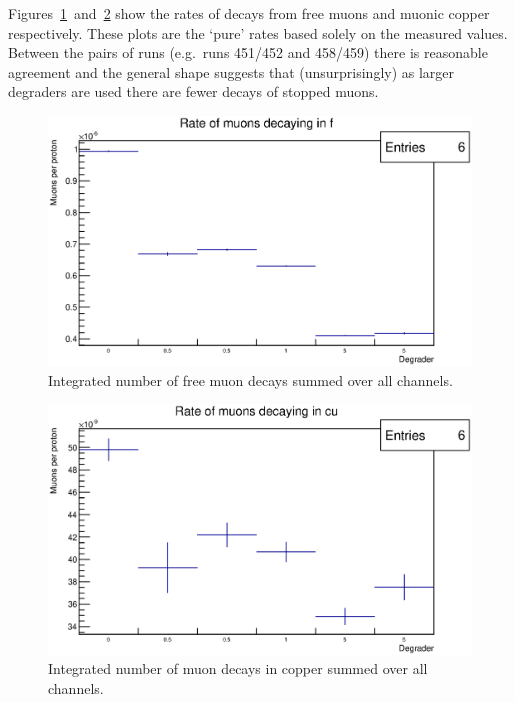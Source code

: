 Figures~\ref{fig:images_momentum_spectrum_run_muon_rate_in_f}~and~\ref{fig:images_momentum_spectrum_run_muon_rate_in_cu} show the rates of decays from free muons and muonic copper respectively. These plots are the `pure' rates based solely on the measured values. Between the pairs of runs (e.g.\ runs 451/452 and 458/459) there is reasonable agreement and the general shape suggests that (unsurprisingly) as larger degraders are used there are fewer decays of stopped muons. 

\begin{figure}[hptb]
  \centering
    \includegraphics[width=.9\textwidth]{images/momentum_spectrum/run_muon_rate_in_f.eps}
  \caption{Integrated number of free muon decays summed over all channels.}
  \label{fig:images_momentum_spectrum_run_muon_rate_in_f}
\end{figure}

\begin{figure}[hptb]
  \centering
    \includegraphics[width=.9\textwidth]{images/momentum_spectrum/run_muon_rate_in_cu.eps}
  \caption{Integrated number of muon decays in copper summed over all channels.}
  \label{fig:images_momentum_spectrum_run_muon_rate_in_cu}
\end{figure}


